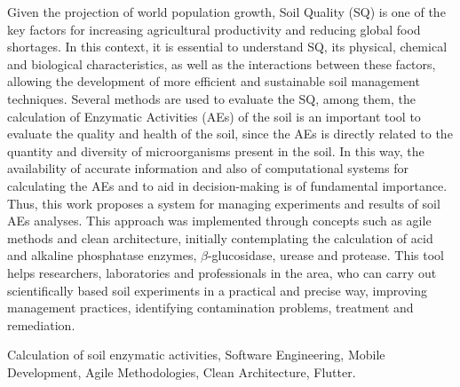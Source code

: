Given the projection of world population growth, Soil Quality (SQ) is one of the key factors for increasing agricultural productivity and reducing global food shortages. In this context, it is essential to understand SQ, its physical, chemical and biological characteristics, as well as the interactions between these factors, allowing the development of more efficient and sustainable soil management techniques. Several methods are used to evaluate the SQ, among them, the calculation of Enzymatic Activities (AEs) of the soil is an important tool to evaluate the quality and health of the soil, since the AEs is directly related to the quantity and diversity of microorganisms present in the soil. In this way, the availability of accurate information and also of computational systems for calculating the AEs and to aid in decision-making is of fundamental importance. Thus, this work proposes a system for managing experiments and results of soil AEs analyses. This approach was implemented through concepts such as agile methods and clean architecture, initially contemplating the calculation of acid and alkaline phosphatase enzymes, $\beta$-glucosidase, urease and protease. This tool helps researchers, laboratories and professionals in the area, who can carry out scientifically based soil experiments in a practical and precise way, improving management practices, identifying contamination problems, treatment and remediation.

\begin{keywords}
Calculation of soil enzymatic activities, Software Engineering, Mobile Development, Agile Methodologies, Clean Architecture, Flutter.
\end{keywords}